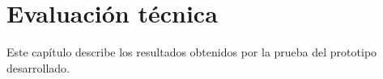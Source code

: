 \ifx\all\undefined


\fi
 
\chapter{Evaluación técnica}

Este capítulo describe los resultados obtenidos por la prueba del prototipo desarrollado.

\ifx\all\undefined

\fi